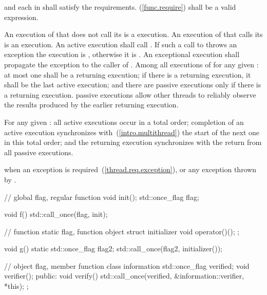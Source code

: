 \begin{itemdescr}
\pnum
\requires {} and each  in  shall satisfy the
 requirements.
 \brk{}(\ref{func.require}) shall be
a valid expression.

\pnum
\effects An execution of  that does not call its  is a
 execution. An execution of  that calls its 
is an  execution. An active execution shall call
. If such a call to 
throws an exception the execution is , otherwise it is .
An exceptional execution shall propagate the exception to the caller of
. Among all executions of  for any given
: at most one shall be a returning execution; if there is a
returning execution, it shall be the last active execution; and there are
passive executions only if there is a returning execution. \enternote passive
executions allow other threads to reliably observe the results produced by the
earlier returning execution. \exitnote

\pnum
\sync For any given : all active executions occur in a total
order; completion of an active execution synchronizes with~(\ref{intro.multithread})
the start of the next one in this total order; and the returning execution
synchronizes with the return from all passive executions.

\pnum\throws {} when
an exception is required~(\ref{thread.req.exception}), or any exception thrown by .

\pnum
\enterexample
\begin{codeblock}
// global flag, regular function
void init();
std::once_flag flag;

void f() {
  std::call_once(flag, init);
}

// function static flag, function object
struct initializer {
  void operator()();
};

void g() {
  static std::once_flag flag2;
  std::call_once(flag2, initializer());
}

// object flag, member function
class information {
  std::once_flag verified;
  void verifier();
public:
  void verify() { std::call_once(verified, &information::verifier, *this); }
};
\end{codeblock}
\exitexample
\end{itemdescr}


